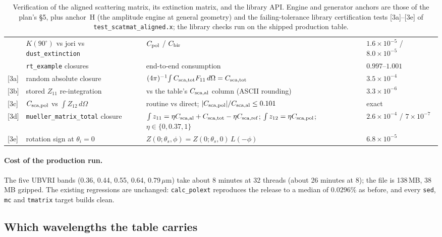 \documentclass{my_memo}
\newcommand{\code}[1]{\texttt{#1}}
\newcommand{\um}{\ensuremath{\,\mu\mathrm{m}}}
\begin{document}
\begin{table}[h]
\begin{tabular}{@{}llp{}l@{}}
  & $K(90^\circ)$ vs jori vs \code{dust\_extinction} & $C_{\rm pol}$ / $C_{\rm bir}$ & $1.6\times10^{-5}$ / $8.0\times10^{-5}$ \\
  & \code{rt\_example} closures & end-to-end consumption & $0.997$--$1.001$ \\
{[3a]} & random absolute closure & $(4\pi)^{-1}\!\int C_{\rm sca,tot}F_{11}\,d\Omega=C_{\rm sca,tot}$ & $3.5\times10^{-4}$ \\
{[3b]} & stored $Z_{11}$ re-integration & vs the table's $C_{\rm sca,al}$ column (ASCII rounding) & $3.3\times10^{-6}$ \\
{[3c]} & $C_{\rm sca,pol}$ vs $\int Z_{12}\,d\Omega$ & routine vs direct; $|C_{\rm sca,pol}|/C_{\rm sca,al}\le0.101$ & exact \\
{[3d]} & \code{mueller\_matrix\_total} closure & $\int z_{11}=\eta C_{\rm sca,al}+C_{\rm sca,tot}-\eta C_{\rm sca,ref}$; $\int z_{12}=\eta C_{\rm sca,pol}$; $\eta\in\{0,0.37,1\}$ & $2.6\!\times\!10^{-4}$ / $7\!\times\!10^{-7}$ \\
{[3e]} & rotation sign at $\theta_i=0$ & $Z(0;\theta_s,\phi)=Z(0;\theta_s,0)\,L(-\phi)$ & $6.8\times10^{-5}$ \\
\bottomrule
\end{tabular}
\caption{Verification of the aligned scattering matrix, its extinction matrix, and
the library API. Engine and generator anchors are those of the plan's \S5, plus
anchor~H (the amplitude engine at general geometry) and the failing-tolerance
library certification tests [3a]--[3e] of \code{test\_scatmat\_aligned.x}; the
library checks run on the shipped production table.}
\label{tab:alignverif}
\end{table}

\paragraph{Cost of the production run.} The five UBVRI bands (0.36, 0.44, 0.55,
0.64, 0.79\um) take about 8 minutes at 32 threads (about 26 minutes at 8); the
file is 138\,MB, 38\,MB gzipped. The existing regressions are unchanged:
\code{calc\_polext} reproduces the release to a median of $0.0296\%$ as before,
and every \code{sed}, \code{mc} and \code{tmatrix} target builds clean.

\subsection{Which wavelengths the table carries}\label{sec:aligned:bands}
\end{document}
